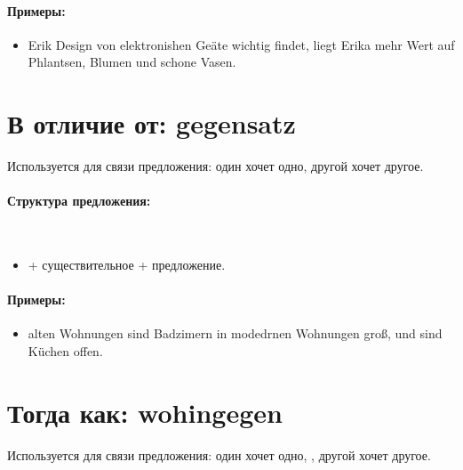 \paragraph{Примеры:}
\begin{itemize}
    \item {} Erik Design von elektronishen Geäte wichtig findet, liegt Erika mehr Wert auf Phlantsen, Blumen und schone Vasen.
          ~\\ 
\end{itemize}

\section{В отличие от: gegensatz}

Используется для связи предложения:  один хочет одно, другой хочет другое.

\paragraph{Структура предложения:} ~\\
\begin{itemize}
\item {} + существительное \dverb{} + предложение.
\end{itemize}

\paragraph{Примеры:}
\begin{itemize}
    \item {} alten Wohnungen sind Badzimern in modedrnen Wohnungen groß, und sind Küchen offen.
          ~\\ 
\end{itemize}

\section{Тогда как: wohingegen}

Используется для связи предложения: один хочет одно, , другой хочет другое.

